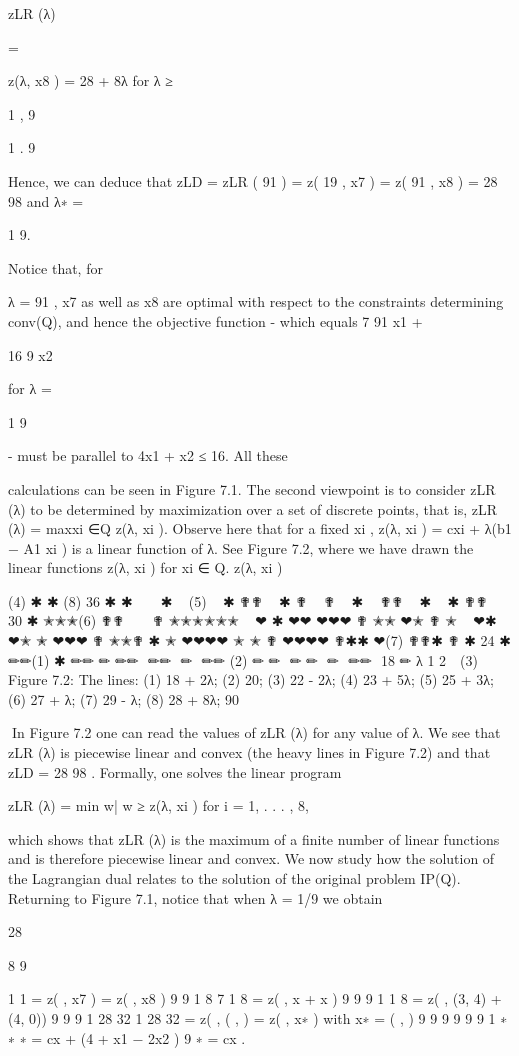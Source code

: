 \documentclass[titlepage]{book}
\theoremstyle{plain}
\theoremstyle{definition}
\theoremstyle{remark}
\begin{document}
zLR (λ)

=

z(λ, x8 ) = 28 + 8λ for λ ≥

1
,
9

1
.
9

Hence, we can deduce that zLD = zLR ( 91 ) = z( 19 , x7 ) = z( 91 , x8 ) = 28 98 and λ∗ =

1
9.

Notice that, for

λ = 91 , x7 as well as x8 are optimal with respect to the constraints determining conv(Q), and hence the
objective function - which equals 7 91 x1 +

16
9 x2

for λ =

1
9

- must be parallel to 4x1 + x2 ≤ 16. All these

calculations can be seen in Figure 7.1.
The second viewpoint is to consider zLR (λ) to be determined by maximization over a set of discrete
points, that is,
zLR (λ) = maxxi ∈Q z(λ, xi ).
Observe here that for a fixed xi , z(λ, xi ) = cxi + λ(b1 − A1 xi ) is a linear function of λ. See Figure 7.2,
where we have drawn the linear functions z(λ, xi ) for xi ∈ Q.
z(λ, xi )

(4)
✱
✱
(8)
36
✱
✱
 
 
✱
 
(5)
 
✱
✟✟
 
✱
✟
 
✟
 
✱
 
✟✟
 
✱
 
✱ ✟✟
 
 
30
✱
✭✭✭(6)
✟✟
 
 
✟ ✭✭✭✭✭✭
 
❤
✱
❤❤
❤❤❤
✟
✭✭
❤✭
✟
✭
 
❤✱
❤✭
✭
❤❤❤
✟
✭✭✟
✱
✭
❤❤❤❤
✭
✭
✟
❤❤❤❤
✟✱✱
❤(7)
✟✟✱
✟
✱
24 ✱
✏✏(1)
✱
✏✏
✏
✏✏

✏✏

✏

✏✏
(2)
✏
✏

✏
✏

✏

✏✏

18 ✏
λ
1
2 
 (3)

Figure 7.2: The lines: (1) 18 + 2λ; (2) 20; (3) 22 - 2λ; (4) 23 + 5λ; (5) 25 + 3λ; (6) 27 + λ; (7) 29 - λ;
(8) 28 + 8λ;
90

In Figure 7.2 one can read the values of zLR (λ) for any value of λ. We see that zLR (λ) is piecewise linear
and convex (the heavy lines in Figure 7.2) and that zLD = 28 98 . Formally, one solves the linear program

zLR (λ) = min {w| w ≥ z(λ, xi ) for i = 1, . . . , 8},

which shows that zLR (λ) is the maximum of a finite number of linear functions and is therefore piecewise
linear and convex.
We now study how the solution of the Lagrangian dual relates to the solution of the original problem
IP(Q). Returning to Figure 7.1, notice that when λ = 1/9 we obtain

28

8
9

1
1
= z( , x7 ) = z( , x8 )
9
9
1 8 7 1 8
= z( , x + x )
9 9
9
1
1 8
= z( , (3, 4) + (4, 0))
9 9
9
1 28 32
1
28 32
= z( , ( , ) = z( , x∗ ) with x∗ = ( , )
9 9 9
9
9 9
1
∗
∗
∗
= cx + (4 + x1 − 2x2 )
9
∗
= cx .
\end{document}

